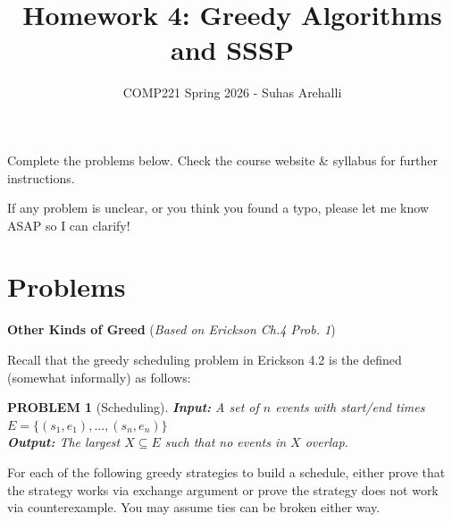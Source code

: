 \documentclass{exam}
\title{Homework 4: Greedy Algorithms and SSSP}
\author{COMP221 Spring 2026 - Suhas Arehalli}
\date{}
\theoremstyle{prob}
\newtheorem*{probstate}{PROBLEM}
\begin{document}
\maketitle

Complete the problems below. Check the course website \& syllabus for further instructions.

If any problem is unclear, or you think you found a typo, please let me know ASAP so I can clarify!

\section*{Problems}

\begin{questions}
    \question \textbf{Other Kinds of Greed} (\textit{Based on Erickson Ch.4 Prob. 1})

    Recall that the greedy scheduling problem in Erickson 4.2 is the defined (somewhat informally) as follows: 

    \begin{probstate}[Scheduling]
        \textbf{Input:} A set of $n$ events with start/end times $E = \{(s_1, e_1), \dots, (s_n, e_n)\}$ \\
        \textbf{Output:} The largest $X \subseteq E$ such that no events in $X$ overlap.
    \end{probstate}

    For each of the following greedy strategies to build a schedule, either prove that the strategy works via exchange argument or prove the strategy does not work via counterexample. You may assume ties can be broken either way.

\end{questions}
\end{document}
